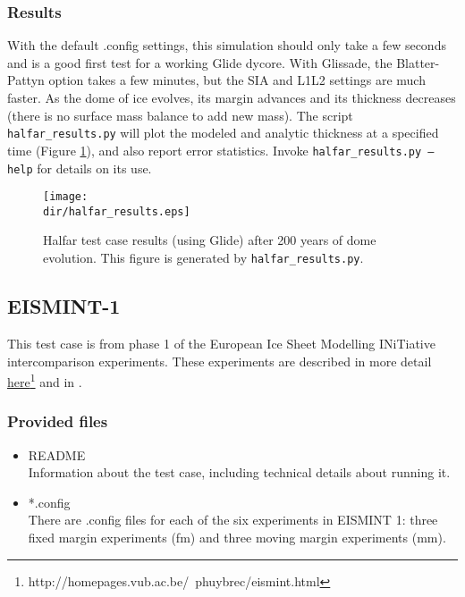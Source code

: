 \subsubsection{Results}
\label{subsecc:halfar_results}
With the default .config settings, this simulation should only take a few seconds and is a good first test for a working Glide dycore.
With Glissade, the Blatter-Pattyn option takes a few minutes, but the SIA and L1L2 settings are much faster.
As the dome of ice evolves, its margin advances and its thickness decreases (there is no surface mass balance to add new mass).  
The script \texttt{halfar\_results.py} will plot the modeled and analytic thickness at a specified time (Figure \ref{fig:halfarresults}), 
and also report error statistics.  Invoke \texttt{halfar\_results.py --help} for details on its use.

\begin{figure}[H]
	\centering
	\texttt{[image: \\dir/halfar\_results.eps]}
	\caption{Halfar test case results (using Glide) after 200 years of dome evolution. This figure is generated by \texttt{halfar\_results.py}.}
	\label{fig:halfarresults}
\end{figure}


\FloatBarrier


\subsection{EISMINT-1}
\label{sec:eismint_description}
This test case is from phase 1 of the European Ice Sheet Modelling INiTiative intercomparison experiments.  These experiments are described in more detail
\href{http://homepages.vub.ac.be/~phuybrec/eismint.html}{here}\footnote{http://homepages.vub.ac.be/~phuybrec/eismint.html} and in \citet{Huybrechts1996}.

\subsubsection{Provided files}
\label{subsec:eismint_files}

\begin{itemize}
	\item README \\
	Information about the test case, including technical details about running it.
	\item *.config \\
  	There are .config files for each of the six experiments in EISMINT 1: three fixed margin experiments (fm) and three moving margin experiments (mm).
\end{itemize}

